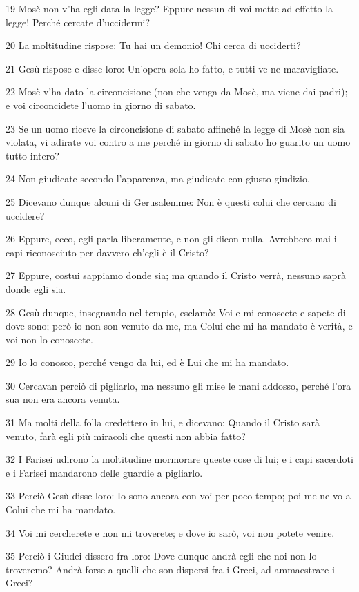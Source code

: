 \par 19 Mosè non v'ha egli data la legge? Eppure nessun di voi mette ad effetto la legge! Perché cercate d'uccidermi?
\par 20 La moltitudine rispose: Tu hai un demonio! Chi cerca di ucciderti?
\par 21 Gesù rispose e disse loro: Un'opera sola ho fatto, e tutti ve ne maravigliate.
\par 22 Mosè v'ha dato la circoncisione (non che venga da Mosè, ma viene dai padri); e voi circoncidete l'uomo in giorno di sabato.
\par 23 Se un uomo riceve la circoncisione di sabato affinché la legge di Mosè non sia violata, vi adirate voi contro a me perché in giorno di sabato ho guarito un uomo tutto intero?
\par 24 Non giudicate secondo l'apparenza, ma giudicate con giusto giudizio.
\par 25 Dicevano dunque alcuni di Gerusalemme: Non è questi colui che cercano di uccidere?
\par 26 Eppure, ecco, egli parla liberamente, e non gli dicon nulla. Avrebbero mai i capi riconosciuto per davvero ch'egli è il Cristo?
\par 27 Eppure, costui sappiamo donde sia; ma quando il Cristo verrà, nessuno saprà donde egli sia.
\par 28 Gesù dunque, insegnando nel tempio, esclamò: Voi e mi conoscete e sapete di dove sono; però io non son venuto da me, ma Colui che mi ha mandato è verità, e voi non lo conoscete.
\par 29 Io lo conosco, perché vengo da lui, ed è Lui che mi ha mandato.
\par 30 Cercavan perciò di pigliarlo, ma nessuno gli mise le mani addosso, perché l'ora sua non era ancora venuta.
\par 31 Ma molti della folla credettero in lui, e dicevano: Quando il Cristo sarà venuto, farà egli più miracoli che questi non abbia fatto?
\par 32 I Farisei udirono la moltitudine mormorare queste cose di lui; e i capi sacerdoti e i Farisei mandarono delle guardie a pigliarlo.
\par 33 Perciò Gesù disse loro: Io sono ancora con voi per poco tempo; poi me ne vo a Colui che mi ha mandato.
\par 34 Voi mi cercherete e non mi troverete; e dove io sarò, voi non potete venire.
\par 35 Perciò i Giudei dissero fra loro: Dove dunque andrà egli che noi non lo troveremo? Andrà forse a quelli che son dispersi fra i Greci, ad ammaestrare i Greci?
